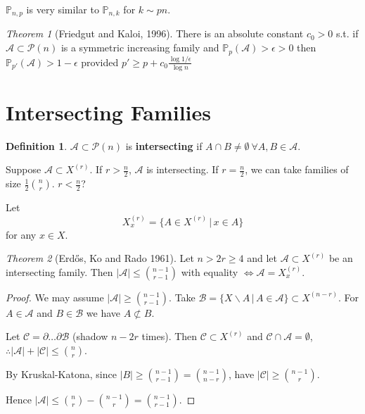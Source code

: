 \documentclass[a4paper]{article}
\theoremstyle{definition}
\newtheorem*{definition}{Definition}
\theoremstyle{remark}
\theoremstyle{default}
\newtheorem{theorem}{Theorem}
\newcommand*\abs[1]{\left|#1\right|}
\begin{document}
$\mathbb{P}_{n, p}$ is very similar to $\mathbb{P}_{n,k}$ for $k \sim pn$.

\begin{theorem}[Friedgut and Kaloi, 1996]
	There is an absolute constant $c_0 > 0$ s.t. if $\mathcal{A} \subset \mathcal{P}(n)$ is a symmetric increasing family and $\mathbb{P}_p(\mathcal{A}) > \epsilon > 0$
	then $\mathbb{P}_{p'}(\mathcal{A}) > 1 - \epsilon$
	provided $p' \geq p + c_0 \frac{\log{1/\epsilon}}{\log{n}}$
\end{theorem}

\section{Intersecting Families}
\setcounter{theorem}{0}
\begin{definition}
	$\mathcal{A} \subset \mathcal{P}(n)$ is \textbf{intersecting} if $A \cap B \neq \emptyset\ \forall A, B \in \mathcal{A}$.
\end{definition}

Suppose $\mathcal{A} \subset X^{(r)}$.
If $r > \frac{n}{2}$, $\mathcal{A}$ is intersecting.
If $r = \frac{n}{2}$, we can take families of size $\frac{1}{2}{n \choose r}$.
$r < \frac{n}{2}$?

Let $$X_x^{(r)} = \{A \in X^{(r)} \,|\, x \in A\}$$ for any $x \in X$.

\begin{theorem}[Erd\H{o}s, Ko and Rado 1961]
	Let $n > 2r \geq 4$ and let $\mathcal{A} \subset X^{(r)}$ be an intersecting family.
	Then $\abs{\mathcal{A}} \leq {n-1 \choose r-1}$ with equality $\iff \mathcal{A} = X_x^{(r)}$.
\end{theorem}
\begin{proof}
	We may assume $\abs{\mathcal{A}} \geq {n-1 \choose r-1}$.
	Take $\mathcal{B} = \{X\backslash A \,|\, A \in \mathcal{A}\} \subset X^{(n-r)}$.
	For $A \in \mathcal{A}$ and $B \in \mathcal{B}$ we have $A \not\subset B$.
	
	Let $\mathcal{C} = \partial \dots \partial \mathcal{B}$ (shadow $n-2r$ times).
	Then $\mathcal{C} \subset X^{(r)}$ and $\mathcal{C} \cap \mathcal{A} = \emptyset$,
	$\therefore \abs{\mathcal{A}} + \abs{\mathcal{C}} \leq {n \choose r}$.
	
	By Kruskal-Katona, since $\abs{B} \geq {n-1 \choose r-1} = {n-1 \choose n-r}$,
	have $\abs{\mathcal{C}} \geq {n-1 \choose r}$.
	
	Hence $\abs{\mathcal{A}} \leq {n \choose r} - {n -1 \choose r} = {n-1 \choose r-1}$.
\end{proof}
\end{document}

